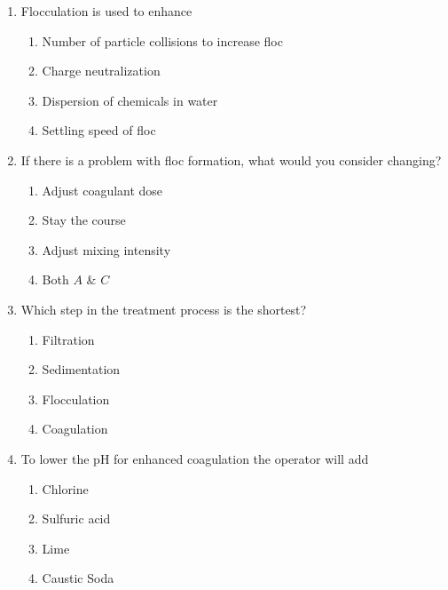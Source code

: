 \begin{enumerate}
\item Flocculation is used to enhance\\
\begin{enumerate}
\item Number of particle collisions to increase floc\\
\item Charge neutralization\\
\item Dispersion of chemicals in water\\
\item Settling speed of floc
\end{enumerate}

\item  If there is a problem with floc formation, what would you consider changing?\\
\begin{enumerate}
\item Adjust coagulant dose\\
\item Stay the course\\
\item Adjust mixing intensity\\
\item Both $A$ \& $C$
\end{enumerate}

\item  Which step in the treatment process is the shortest?\\
\begin{enumerate}
\item Filtration\\
\item Sedimentation\\
\item Flocculation\\
\item Coagulation
\end{enumerate}

\item  To lower the $\mathrm{pH}$ for enhanced coagulation the operator will add\\
\begin{enumerate}
\item Chlorine\\
\item Sulfuric acid\\
\item Lime\\
\item Caustic Soda
\end{enumerate}


\end{enumerate}

